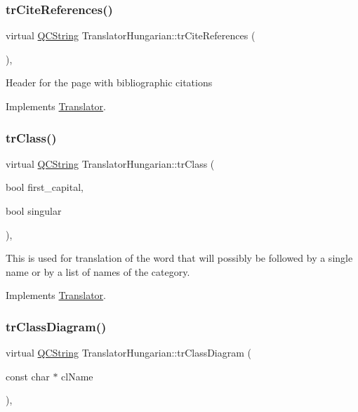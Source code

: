 \subsubsection{\texorpdfstring{trCiteReferences()}{trCiteReferences()}}
{\footnotesize\ttfamily virtual \mbox{\hyperlink{class_q_c_string}{Q\+C\+String}} Translator\+Hungarian\+::tr\+Cite\+References (\begin{DoxyParamCaption}{ }\end{DoxyParamCaption})\hspace{0.3cm}{\ttfamily [inline]}, {\ttfamily [virtual]}}

Header for the page with bibliographic citations 

Implements \mbox{\hyperlink{class_translator}{Translator}}.

\mbox{\label{class_translator_hungarian_a864e8bd5517deb658ef455a2173755a5}} 
\subsubsection{\texorpdfstring{trClass()}{trClass()}}
{\footnotesize\ttfamily virtual \mbox{\hyperlink{class_q_c_string}{Q\+C\+String}} Translator\+Hungarian\+::tr\+Class (\begin{DoxyParamCaption}\item[{bool}]{first\+\_\+capital,  }\item[{bool}]{singular }\end{DoxyParamCaption})\hspace{0.3cm}{\ttfamily [inline]}, {\ttfamily [virtual]}}

This is used for translation of the word that will possibly be followed by a single name or by a list of names of the category. 

Implements \mbox{\hyperlink{class_translator}{Translator}}.

\mbox{\label{class_translator_hungarian_a74c0947c746db5e2e2037c00ffd5718c}} 
\subsubsection{\texorpdfstring{trClassDiagram()}{trClassDiagram()}}
{\footnotesize\ttfamily virtual \mbox{\hyperlink{class_q_c_string}{Q\+C\+String}} Translator\+Hungarian\+::tr\+Class\+Diagram (\begin{DoxyParamCaption}\item[{const char $\ast$}]{cl\+Name }\end{DoxyParamCaption})\hspace{0.3cm}{\ttfamily [inline]}, {\ttfamily [virtual]}}

